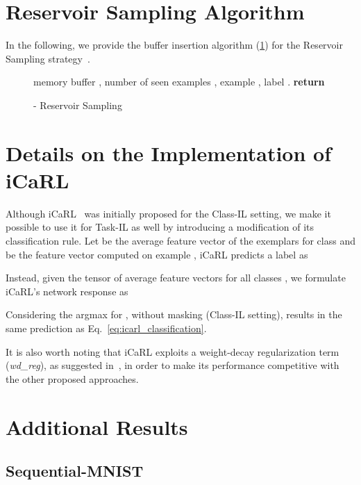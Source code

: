 \documentclass{article}
\begin{document}
\section{Reservoir Sampling Algorithm}
In the following, we provide the buffer insertion algorithm (\ref{alg:reservoir}) for the Reservoir Sampling strategy~\cite{vitter1985random}.
\begin{figure}[H]
    \centering
    \begin{algorithm}[H]
    \caption{- Reservoir Sampling}
    \label{alg:reservoir}
    \begin{algorithmic}
       memory buffer , number of seen examples , example , label .
      \IF{} \STATE  \ELSE 
      \STATE  
      \IF{  }
      \STATE 
      \ENDIF
      \ENDIF
      \STATE \textbf{return} 
    \end{algorithmic}
    \end{algorithm}
\end{figure}

\section{Details on the Implementation of iCaRL}
Although iCaRL~\cite{rebuffi2017icarl} was initially proposed for the Class-IL setting, we make it possible to use it for Task-IL as well by introducing a modification of its classification rule. Let  be the average feature vector of the exemplars for class  and  be the feature vector computed on example , iCaRL predicts a label  as

Instead, given the tensor of average feature vectors for all classes , we formulate iCaRL's network response  as 

Considering the argmax for , without masking (Class-IL setting), results in the same prediction as Eq.~\ref{eq:icarl_classification}.

It is also worth noting that iCaRL exploits a weight-decay regularization term (\textit{wd\_reg}), as suggested in~\cite{rebuffi2017icarl}, in order to make its performance competitive with the other proposed approaches.

\section {Additional Results}

\subsection{Sequential-MNIST}
\label{subsec:smnist}
\end{document}
